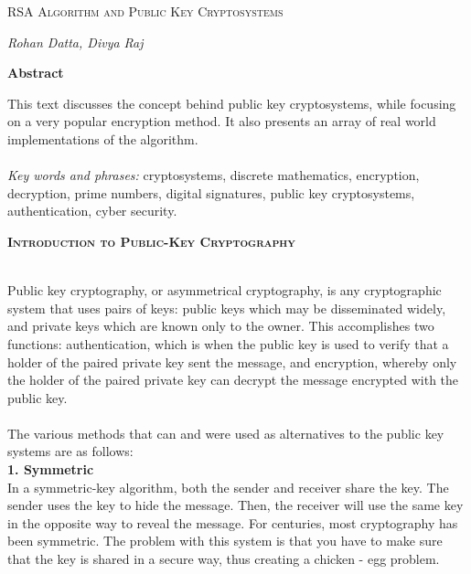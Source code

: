 \documentclass[12 pt]{article}
\begin{document}
\begin{titlepage}
\begin{Huge}
\begin{center}
\textsc{ RSA Algorithm \linebreak
and \linebreak
Public Key Cryptosystems}
\end{center}
\end{Huge}
\begin{center}
\begin{large}
\textsl{ Rohan Datta, Divya Raj}
\end{large}
\end{center}

\bigskip 
\begin{center}
\textbf{Abstract}
\end{center}
This text discusses the concept behind public key cryptosystems, while focusing on a very popular encryption method. It also presents an array of real world implementations of the algorithm.
\\
\\
\textit{Key words and phrases:} cryptosystems, discrete mathematics, encryption, decryption, prime numbers, digital signatures, public key cryptosystems, authentication, cyber security.
\end{titlepage}
\pagebreak
\begin{LARGE}	
\noindent \textbf{\textsc{Introduction to Public-Key Cryptography}}
\end{LARGE}

\noindent 
\\Public key cryptography, or asymmetrical cryptography, is any cryptographic system that uses pairs of keys: public keys which may be disseminated widely, and private keys which are known only to the owner. This accomplishes two functions: authentication, which is when the public key is used to verify that a holder of the paired private key sent the message, and encryption, whereby only the holder of the paired private key can decrypt the message encrypted with the public key.
\\\\The various methods that can and were used as alternatives to the public key systems are as follows:
\\\textbf{1. Symmetric}\\In a symmetric-key algorithm, both the sender and receiver share the key. The sender uses the key to hide the message. Then, the receiver will use the same key in the opposite way to reveal the message. For centuries, most cryptography has been symmetric. The problem with this system is that you have to make sure that the key is shared in a secure way, thus creating a chicken - egg problem.
\end{document}
